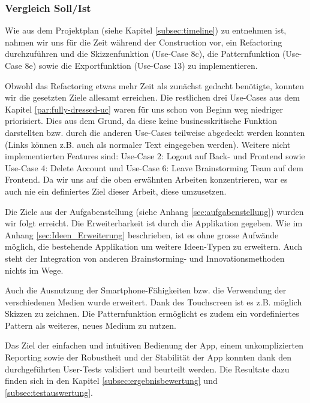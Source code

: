 \subsubsection{Vergleich Soll/Ist}
Wie aus dem Projektplan (siehe Kapitel \ref{subsec:timeline}) zu entnehmen ist, nahmen wir uns für die Zeit während der Construction vor, ein Refactoring durchzuführen und die Skizzenfunktion (Use-Case 8c), die Patternfunktion (Use-Case 8e) sowie die Exportfunktion (Use-Case 13) zu implementieren. 

Obwohl das Refactoring etwas mehr Zeit als zunächst gedacht benötigte, konnten wir die gesetzten Ziele allesamt erreichen. Die restlichen drei Use-Cases aus dem Kapitel \ref{par:fully-dressed-uc} waren für uns schon von Beginn weg niedriger priorisiert. Dies aus dem Grund, da diese keine businesskritische Funktion darstellten bzw. durch die anderen Use-Cases teilweise abgedeckt werden konnten (Links können z.B. auch als normaler Text eingegeben werden). Weitere nicht implementierten Features sind: Use-Case 2: Logout auf Back- und Frontend sowie Use-Case 4: Delete Account und Use-Case 6: Leave Brainstorming Team auf dem Frontend. Da wir uns auf die oben erwähnten Arbeiten konzentrieren, war es auch nie ein definiertes Ziel dieser Arbeit, diese umzusetzen. 

Die Ziele aus der Aufgabenstellung (siehe Anhang \ref{sec:aufgabenstellung}) wurden wir folgt erreicht. Die Erweiterbarkeit ist durch die Applikation gegeben. Wie im Anhang \ref{sec:Ideen_Erweiterung} beschrieben, ist es ohne grosse Aufwände möglich, die bestehende Applikation um weitere Ideen-Typen zu erweitern. Auch steht der Integration von anderen Brainstorming- und Innovationsmethoden nichts im Wege.

Auch die Ausnutzung der Smartphone-Fähigkeiten bzw. die Verwendung der verschiedenen Medien wurde erweitert. Dank des Touchscreen ist es z.B. möglich Skizzen zu zeichnen. Die Patternfunktion ermöglicht es zudem ein vordefiniertes Pattern als weiteres, neues Medium zu nutzen.

Das Ziel der einfachen und intuitiven Bedienung der App, einem unkomplizierten Reporting sowie der Robustheit und der Stabilität der App konnten dank den durchgeführten User-Tests validiert und beurteilt werden. Die Resultate dazu finden sich in den Kapitel \ref{subsec:ergebnisbewertung} und \ref{subsec:testauswertung}.